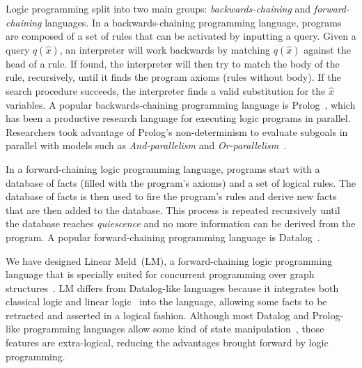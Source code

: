 Logic programming split into two main groups:
\emph{backwards-chaining} and \emph{forward-chaining} languages. In a
backwards-chaining programming language, programs are composed of a
set of rules that can be activated by inputting a query. Given a query
$q(\hat{x})$, an interpreter will work backwards by matching
$q(\hat{x})$ against the head of a rule. If found, the interpreter
will then try to match the body of the rule, recursively, until it
finds the program axioms (rules without body). If the search procedure
succeeds, the interpreter finds a valid substitution for the $\hat{x}$
variables. A popular backwards-chaining programming language is
Prolog~\cite{Colmerauer:1993:BP:154766.155362}, which has been a
productive research language for executing logic programs in
parallel. Researchers took advantage of Prolog's non-determinism to
evaluate subgoals in parallel with models such as
\emph{And-parallelism} and
\emph{Or-parallelism}~\cite{Gupta:2001:PEP:504083.504085}.

In a forward-chaining logic programming language, programs start with
a database of facts (filled with the program's axioms) and a set of
logical rules. The database of facts is then used to fire the
program's rules and derive new facts that are then added to the
database. This process is repeated recursively until the database
reaches \emph{quiescence} and no more information can be derived from
the program. A popular forward-chaining programming language is
Datalog~\cite{Ramakrishnan93asurvey}.

We have designed Linear Meld~(LM), a forward-chaining logic programming
language that is specially suited for
concurrent programming over graph structures~\cite{cruz-iclp14}. LM
differs from Datalog-like languages because it integrates both
classical logic and linear logic~\cite{girard-87} into the language, allowing some
facts to be retracted and asserted in a logical fashion. Although most
Datalog and Prolog-like programming languages allow some kind of state
manipulation~\cite{Liu98extendingdatalog}, those features are
extra-logical, reducing the advantages brought forward by logic programming.

